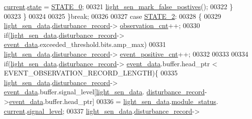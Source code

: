 \begin{DoxyCode}
      \hyperlink{a00017_ab8af48cdbba92b3ae39c4470e53af944}{current}.\hyperlink{a00017_a6b8d8e916bc56265a3fd279bd26b6d1b}{state} = \hyperlink{a00021_ad6739dbbe5581cac99b7dc8a5e09949c}{STATE\_0};
00321                          \hyperlink{a00047_acef1622ec5c40fe90bf6184813716e34}{light\_sen\_mark\_false\_postives}();
00322                     \}
00323              \}
00324              
00325         \}\textcolor{keywordflow}{break};
00326 
00327           \textcolor{keywordflow}{case} \hyperlink{a00021_a66fa48e832a64af4d405511cecc4c752}{STATE\_2}:
00328         \{
00329             \hyperlink{a00047_a53c98c9f84d5cecf0747bbe1f6b83696}{light\_sen\_data}.\hyperlink{a00024_ac9b38e2c1d3f1013a88d33506c754152}{disturbance\_record}->
      \hyperlink{a00028_ad5b0bac02ce266b91b2b52a1c3ea1d78}{observation\_cnt}++;
00330             \textcolor{keywordflow}{if}(\hyperlink{a00047_a53c98c9f84d5cecf0747bbe1f6b83696}{light\_sen\_data}.\hyperlink{a00024_ac9b38e2c1d3f1013a88d33506c754152}{disturbance\_record}->
      \hyperlink{a00028_a8c0bda69e71ef674e60da47ad0be9ab0}{event\_data}.exceeded\_threshold.bits.amp\_max)
00331                 \hyperlink{a00047_a53c98c9f84d5cecf0747bbe1f6b83696}{light\_sen\_data}.\hyperlink{a00024_ac9b38e2c1d3f1013a88d33506c754152}{disturbance\_record}->
      \hyperlink{a00028_a7397b9d76d4b57500f27bb23d258a18a}{event\_positive\_cnt}++;
00332 
00333 
00334             \textcolor{keywordflow}{if}(\hyperlink{a00047_a53c98c9f84d5cecf0747bbe1f6b83696}{light\_sen\_data}.\hyperlink{a00024_ac9b38e2c1d3f1013a88d33506c754152}{disturbance\_record}->
      \hyperlink{a00028_a8c0bda69e71ef674e60da47ad0be9ab0}{event\_data}.buffer.head\_ptr < EVENT\_OBSERVATION\_RECORD\_LENGTH)\{
00335             \hyperlink{a00047_a53c98c9f84d5cecf0747bbe1f6b83696}{light\_sen\_data}.\hyperlink{a00024_ac9b38e2c1d3f1013a88d33506c754152}{disturbance\_record}->
      \hyperlink{a00028_a8c0bda69e71ef674e60da47ad0be9ab0}{event\_data}.buffer.signal\_level[\hyperlink{a00047_a53c98c9f84d5cecf0747bbe1f6b83696}{light\_sen\_data}.
      \hyperlink{a00024_ac9b38e2c1d3f1013a88d33506c754152}{disturbance\_record}->\hyperlink{a00028_a8c0bda69e71ef674e60da47ad0be9ab0}{event\_data}.buffer.head\_ptr]
00336                     = \hyperlink{a00047_a53c98c9f84d5cecf0747bbe1f6b83696}{light\_sen\_data}.\hyperlink{a00024_a5a53c391562b059eb744ac679f3765ca}{module\_status}.
      \hyperlink{a00017_ab8af48cdbba92b3ae39c4470e53af944}{current}.\hyperlink{a00017_abcdf2bc0c2e5a14863938ae28c3bc96e}{signal\_level};
00337             \hyperlink{a00047_a53c98c9f84d5cecf0747bbe1f6b83696}{light\_sen\_data}.\hyperlink{a00024_ac9b38e2c1d3f1013a88d33506c754152}{disturbance\_record}->

\end{DoxyCode}
